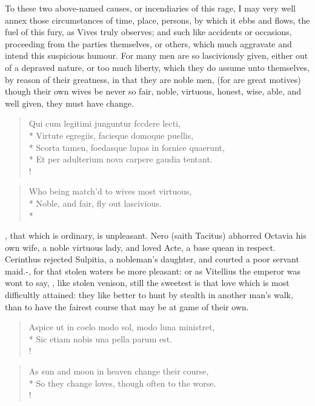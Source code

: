 To these two above-named causes, or incendiaries of this rage, I may
very well annex those circumstances of time, place, persons, by which
it ebbs and flows, the fuel of this fury, as Vives truly
observes; and such like accidents or occasions, proceeding from the
parties themselves, or others, which much aggravate and intend this
suspicious humour. For many men are so lasciviously given, either out
of a depraved nature, or too much liberty, which they do assume unto
themselves, by reason of their greatness, in that they are noble men,
(for  are great motives)
though their own wives be never so fair, noble, virtuous, honest, wise,
able, and well given, they must have change.
%
\begin{latin}%
\begin{verse}%
Qui cum legitimi junguntur fccdere lecti,\\*
Virtute egregiis, facieque domoque puellis,\\*
Scorta tamen, foedasque lupas in fornice quaerunt,\\*
Et per adulterium nova carpere gaudia tentant.\\!
\end{verse}%
\end{latin}%
%
\begin{verse}%
Who being match'd to wives most virtuous,\\*
Noble, and fair, fly out lascivious.\\*
\end{verse}%
%

, that which is ordinary, is unpleasant. Nero
(saith Tacitus) abhorred Octavia his own wife, a noble virtuous lady,
and loved Acte, a base quean in respect. Cerinthus rejected
Sulpitia, a nobleman's daughter, and courted a poor servant maid.-, for that stolen waters be more
pleasant: or as Vitellius the emperor was wont to say, , like stolen venison, still the
sweetest is that love which is most difficultly attained: they like
better to hunt by stealth in another man's walk, than to have the
fairest course that may be at game of their own.
%
\begin{latin}%
\begin{verse}%
Aspice ut in coelo modo sol, modo luna ministret,\\*
Sic etiam nobis una pella parum est.\\!
\end{verse}%
\end{latin}%
\translationrule%
\begin{verse}%
As sun and moon in heaven change their course,\\*
So they change loves, though often to the worse.\\!
\end{verse}%
%

